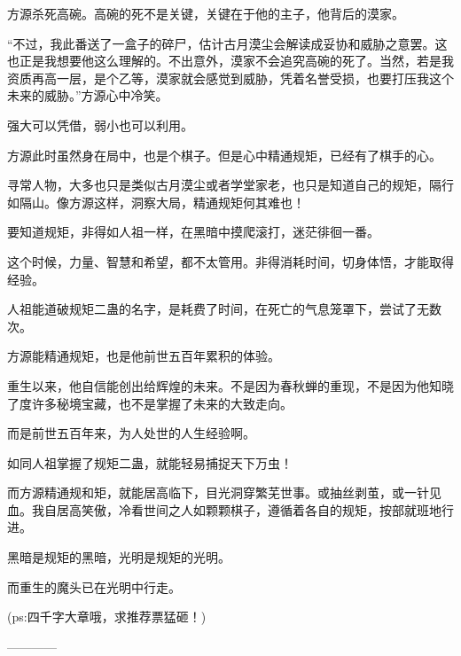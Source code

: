 \begin{this_body}
方源杀死高碗。高碗的死不是关键，关键在于他的主子，他背后的漠家。

“不过，我此番送了一盒子的碎尸，估计古月漠尘会解读成妥协和威胁之意罢。这也正是我想要他这么理解的。不出意外，漠家不会追究高碗的死了。当然，若是我资质再高一层，是个乙等，漠家就会感觉到威胁，凭着名誉受损，也要打压我这个未来的威胁。”方源心中冷笑。

强大可以凭借，弱小也可以利用。

方源此时虽然身在局中，也是个棋子。但是心中精通规矩，已经有了棋手的心。

寻常人物，大多也只是类似古月漠尘或者学堂家老，也只是知道自己的规矩，隔行如隔山。像方源这样，洞察大局，精通规矩何其难也！

要知道规矩，非得如人祖一样，在黑暗中摸爬滚打，迷茫徘徊一番。

这个时候，力量、智慧和希望，都不太管用。非得消耗时间，切身体悟，才能取得经验。

人祖能道破规矩二蛊的名字，是耗费了时间，在死亡的气息笼罩下，尝试了无数次。

方源能精通规矩，也是他前世五百年累积的体验。

重生以来，他自信能创出给辉煌的未来。不是因为春秋蝉的重现，不是因为他知晓了度许多秘境宝藏，也不是掌握了未来的大致走向。

而是前世五百年来，为人处世的人生经验啊。

如同人祖掌握了规矩二蛊，就能轻易捕捉天下万虫！

而方源精通规和矩，就能居高临下，目光洞穿繁芜世事。或抽丝剥茧，或一针见血。我自居高笑傲，冷看世间之人如颗颗棋子，遵循着各自的规矩，按部就班地行进。

黑暗是规矩的黑暗，光明是规矩的光明。

而重生的魔头已在光明中行走。

(ps:四千字大章哦，求推荐票猛砸！)

------------

\end{this_body}

